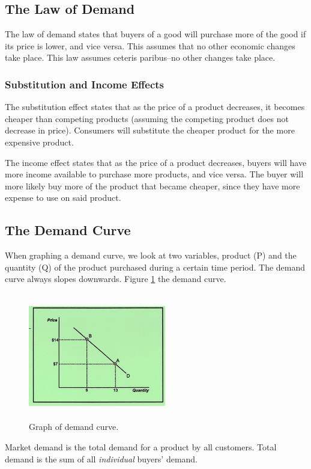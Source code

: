 \documentclass[a4paper, 12pt] {article}
\begin{document}
\subsection{The Law of Demand}
The law of demand states that buyers of a good will purchase more of the good
if its price is lower, and vice versa. This assumes that no other economic changes
take place. This law assumes ceteris paribus--no other changes take place.

\subsubsection{Substitution and Income Effects}
The substitution effect states that as the price of a product decreases, it
becomes cheaper than competing products (assuming the competing product does not
decrease in price). Consumers will substitute the cheaper product for the more
expensive product.

The income effect states that as the price of a product decreases, buyers will
have more income available to purchase more products, and vice versa. The buyer
will more likely buy more of the product that became cheaper, since they have
more expense to use on said product.

\subsection{The Demand Curve}
When graphing a demand curve, we look at two variables, product (P) and the
quantity (Q) of the product purchased during a certain time period. The demand
curve always slopes downwards. Figure \ref{fig:demand_curve} the demand curve.
\begin{figure}
    \centering
    \includegraphics[height=5.5cm, width=6cm]{demand_curve.jpg}
    \caption{Graph of demand curve.}
    \label{fig:demand_curve}
\end{figure}

Market demand is the total demand for a product by all customers. Total demand
is the sum of all \emph{individual} buyers' demand.
\end{document}
